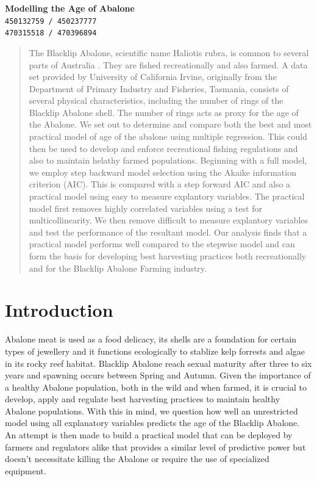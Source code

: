 \documentclass[10pt,twocolumn]{article}
\begin{document}
	\begin{center}
		\textbf{\Large Modelling the Age of Abalone} \\\vspace{4mm}
		\texttt{450132759 / 450237777\\470315518 / 470396894}
	\end{center}
	\begin{abstract}
		The Blacklip Abalone, scientific name Haliotis rubra, is common to several parts of Australia \cite{source}. They are fished recreationally and also farmed. A data set provided by University of California Irvine, originally from the Department of Primary Industry and Fisheries, Tasmania, consists of several physical characteristics, including the number of rings of the Blacklip Abalone shell. The number of rings acts as proxy for the age of the Abalone. We set out to determine and compare both the best and most practical model of age of the abalone using multiple regression. This could then be used to develop and enforce recreational fishing regulations and also to maintain helathy farmed populations. Beginning with a full model, we employ step backward model selection using the Akaike information criterion (AIC). This is compared with a step forward AIC and also a practical model using easy to measure explantory variables. The practical model first removes highly correlated variables using a test for multicollinearity. We then remove difficult to measure explantory variables and test the performance of the resultant model. Our analysis finds that a practical model performs well compared to the stepwise model and can form the basis for developing best harvesting practices both recreationally and for the Blacklip Abalone Farming industry.
	\end{abstract}

	\section{Introduction}
		Abalone meat is used as a food delicacy, its shells are a foundation for certain types of jewellery and it functions ecologically to stablize kelp forrests and algae in its rocky reef habitat. Blacklip Abalone reach sexual maturity after three to six years and spawning occurs between Spring and Autumn\cite{blacklip}. Given the importance of a healthy Abalone population, both in the wild and when farmed, it is crucial to develop, apply and regulate best harvesting practices to maintain healthy Abalone populations. With this in mind, we question how well an unrestricted model using all explanatory variables predicts the age of the Blacklip Abalone. An attempt is then made to build a practical model that can be deployed by farmers and regulators alike that provides a similar level of predictive power but doesn't necessitate killing the Abalone or require the use of specialized equipment.					
\end{document}
